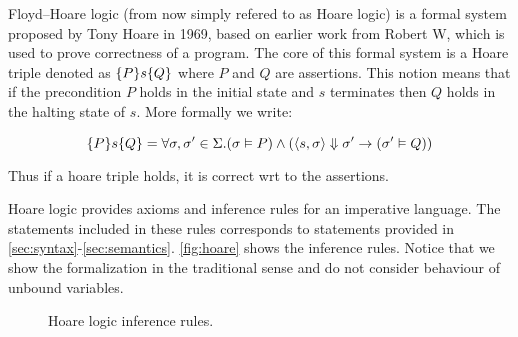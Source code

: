 Floyd–Hoare logic (from now simply refered to as Hoare logic) is a formal system proposed by Tony Hoare in 1969,
based on earlier work from Robert W, which is used to prove correctness of a program.
The core of this formal system is a Hoare triple denoted as $\{P\}s\{Q\}$
where $P$ and $Q$ are assertions. This notion means that if the precondition $P$ holds in the initial state
and $s$ terminates then $Q$ holds in the halting state of $s$. More formally we write:

$$\{P\}s\{Q\} = \forall \sigma, \sigma' \in \Sigma. (\sigma \vDash P) \wedge ( \langle s, \sigma \rangle \Downarrow \sigma' \rightarrow (\sigma' \vDash Q))$$

Thus if a hoare triple holds, it is correct wrt to the assertions.

Hoare logic provides axioms and inference rules for an imperative language.
The statements included in these rules corresponds to statements provided in \autoref{sec:syntax}-\autoref{sec:semantics}. \autoref{fig:hoare} shows the inference rules.
Notice that we show the formalization in the traditional sense and do not consider behaviour of unbound variables.

\begin{figure}[h!]

\inference[HSkip]{}
{}

\inference[HAssign]{}
{}

{}

{}

{}

{}

\label{fig:hoare}
\caption{Hoare logic inference rules.}
\end{figure}

